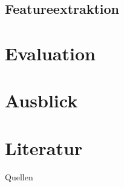 \documentclass[10pt]{beamer}
\begin{document}
\subsection{Featureextraktion}
\section{Evaluation}
\section{Ausblick}
\section{Literatur}
\begin{frame}{Quellen}
    \renewcommand*{\refname}{Referenzen}
    \nocite{*} 
    \printbibliography 
\end{frame} 

{\aauwavesbg
\begin{frame}
\end{frame}}
\end{document}
